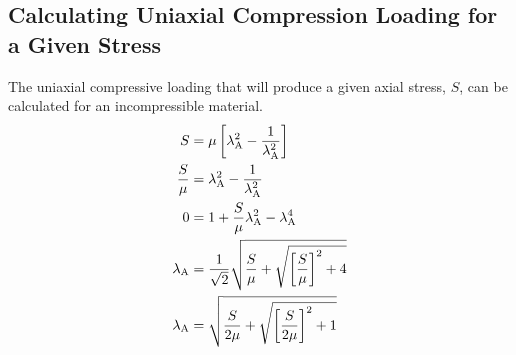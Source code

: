 \documentclass[10pt,letterpaper,oneside]{report}
\newcommand{\scas}[1]{\mbox{{\scriptsize{${\rm{#1}}$}}}{}}
\begin{document}
\subsection{Calculating Uniaxial Compression Loading for a Given Stress}
The uniaxial compressive loading that will produce a given axial stress, $S$, can be calculated for an incompressible material.
\begin{align}
S &= \mu \left[ \lambda_{\scas{A}}^2 - \frac{1}{\lambda_{\scas{A}}^2 } \right] \\
\frac{S}{\mu} &= \lambda_{\scas{A}}^2 - \frac{1}{\lambda_{\scas{A}}^2 } \\
0 &= 1 + \frac{S}{\mu} \lambda_{\scas{A}}^2 - \lambda_{\scas{A}}^4 \\
\lambda_{\scas{A}} &= \frac{1}{\sqrt{2}} \sqrt{ \frac{S}{\mu} + \sqrt{ \left[ \frac{S}{\mu} \right]^2 + 4 } } \\
\lambda_{\scas{A}} &= \sqrt{ \frac{S}{2 \mu} + \sqrt{ \left[ \frac{S}{ 2 \mu} \right] ^2 + 1 } } 
\end{align}
\end{document}
